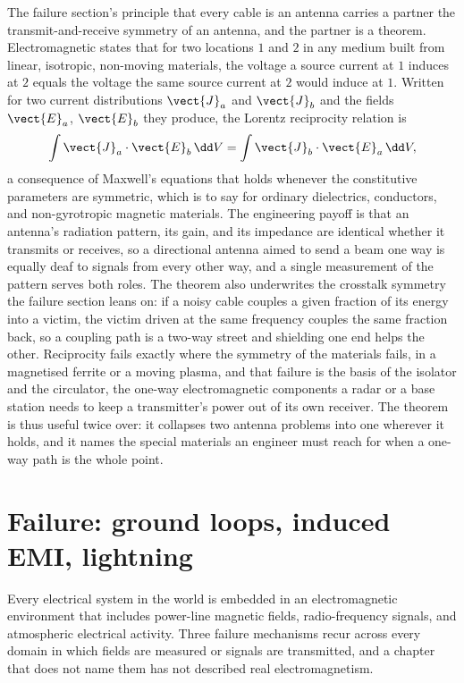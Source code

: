 \begin{mastery}
The failure section's principle that every cable is an antenna carries a
partner the transmit-and-receive symmetry of an antenna, and the partner is a
theorem. Electromagnetic  states that for two locations
$1$ and $2$ in any medium built from linear, isotropic, non-moving materials,
the voltage a source current at $1$ induces at $2$ equals the voltage the same
source current at $2$ would induce at $1$. Written for two current
distributions $\vect{J}_a$ and $\vect{J}_b$ and the fields $\vect{E}_a$,
$\vect{E}_b$ they produce, the Lorentz reciprocity relation is
\[
\int \vect{J}_a\cdot\vect{E}_b\,\dd V = \int \vect{J}_b\cdot\vect{E}_a\,\dd V,
\]
a consequence of Maxwell's equations that holds whenever the constitutive
parameters are symmetric, which is to say for ordinary dielectrics,
conductors, and non-gyrotropic magnetic materials. The engineering payoff is
that an antenna's radiation pattern, its gain, and its impedance are identical
whether it transmits or receives, so a directional antenna aimed to send a
beam one way is equally deaf to signals from every other way, and a single
measurement of the pattern serves both roles. The theorem also underwrites the
crosstalk symmetry the failure section leans on: if a noisy cable couples a
given fraction of its energy into a victim, the victim driven at the same
frequency couples the same fraction back, so a coupling path is a two-way
street and shielding one end helps the other. Reciprocity fails exactly where
the symmetry of the materials fails, in a magnetised ferrite or a moving
plasma, and that failure is the basis of the isolator and the circulator, the
one-way electromagnetic components a radar or a base station needs to keep a
transmitter's power out of its own receiver. The theorem is thus useful twice
over: it collapses two antenna problems into one wherever it holds, and it
names the special materials an engineer must reach for when a one-way path is
the whole point.
\end{mastery}

\section{Failure: ground loops, induced EMI, lightning}

Every electrical system in the world is embedded in an
electromagnetic environment that includes power-line magnetic fields,
radio-frequency signals, and atmospheric electrical activity. Three
failure mechanisms recur across every domain in which fields are
measured or signals are transmitted, and a chapter that does not name
them has not described real electromagnetism.

